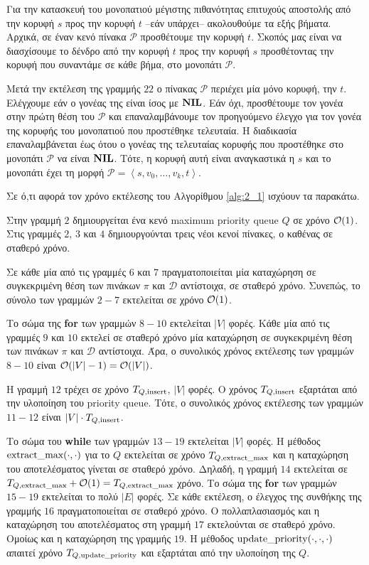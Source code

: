 

Για την κατασκευή του μονοπατιού μέγιστης πιθανότητας επιτυχούς αποστολής από την κορυφή $s$ προς την κορυφή $t$ --εάν υπάρχει-- ακολουθούμε τα εξής βήματα. Αρχικά, σε έναν κενό πίνακα $\mathcal{P}$ προσθέτουμε την κορυφή $t$. Σκοπός μας είναι να διασχίσουμε το δένδρο από την κορυφή $t$ προς την κορυφή $s$ προσθέτοντας την κορυφή που συναντάμε σε κάθε βήμα, στο μονοπάτι $\mathcal{P}$.\par
Μετά την εκτέλεση της γραμμής $22$ ο πίνακας $\mathcal{P}$ περιέχει μία μόνο κορυφή, την $t$. Ελέγχουμε εάν ο γονέας της είναι ίσος με ${\textbf{NIL}}$. Εάν όχι, προσθέτουμε τον γονέα στην πρώτη θέση του $\mathcal{P}$ και επαναλαμβάνουμε τον προηγούμενο έλεγχο για τον γονέα της κορυφής του μονοπατιού που προστέθηκε τελευταία. Η διαδικασία επαναλαμβάνεται έως ότου ο γονέας της τελευταίας κορυφής που προστέθηκε στο μονοπάτι $\mathcal{P}$ να είναι ${\textbf{NIL}}$. Τότε, η κορυφή αυτή είναι αναγκαστικά η $s$ και το μονοπάτι έχει τη μορφή $\mathcal{P}=\left\langle s,v_0,\ldots,v_k,t\right\rangle$.\par
\vspace*{6pt}\par
Σε ό,τι αφορά τον χρόνο εκτέλεσης του Αλγορίθμου \ref{alg:2_1} ισχύουν τα παρακάτω.\par
Στην γραμμή $2$ δημιουργείται ένα κενό maximum priority queue $Q$ σε χρόνο $\mathcal{O}(1)$. Στις γραμμές $2$, $3$ και $4$ δημιουργούνται τρεις νέοι κενοί πίνακες, ο καθένας σε σταθερό χρόνο.\par
Σε κάθε μία από τις γραμμές $6$ και $7$ πραγματοποιείται μία καταχώρηση σε συγκεκριμένη θέση των πινάκων $\pi$ και $\mathcal{D}$ αντίστοιχα, σε σταθερό χρόνο. Συνεπώς, το σύνολο των γραμμών $2-7$ εκτελείται σε χρόνο $\mathcal{O}(1)$.\par
Το σώμα της \textbf{for} των γραμμών $8-10$ εκτελείται $|V|$ φορές. Κάθε μία από τις γραμμές $9$ και $10$ εκτελεί σε σταθερό χρόνο μία καταχώρηση σε συγκεκριμένη θέση των πινάκων $\pi$ και $\mathcal{D}$ αντίστοιχα. Άρα, ο συνολικός χρόνος εκτέλεσης των γραμμών $8-10$ είναι $\mathcal{O}(|V|-1)=\mathcal{O}(|V|)$.\par
Η γραμμή $12$ τρέχει σε χρόνο $T_{Q,\text{{insert}}}$, $|V|$ φορές. Ο χρόνος $T_{Q,\text{{insert}}}$ εξαρτάται από την υλοποίηση του priority queue. Τότε, ο συνολικός χρόνος εκτέλεσης των γραμμών $11-12$ είναι $|V|\cdot T_{Q,\text{{insert}}}$.\par

Το σώμα του \textbf{while} των γραμμών $13-19$ εκτελείται $|V|$ φορές. Η μέθοδος $\text{{extract\_max}}(\cdot,\cdot)$ για το $Q$ εκτελείται σε χρόνο $T_{Q,\text{{extract\_max}}}$ και η καταχώρηση του αποτελέσματος γίνεται σε σταθερό χρόνο. Δηλαδή, η γραμμή $14$ εκτελείται σε $T_{Q,\text{{extract\_max}}}+\mathcal{O}(1) = T_{Q,\text{{extract\_max}}}$ χρόνο. Το σώμα της \textbf{for} των γραμμών $15-19$ εκτελείται το πολύ $|E|$ φορές. Σε κάθε εκτέλεση, ο έλεγχος της συνθήκης της γραμμής $16$ πραγματοποιείται σε σταθερό χρόνο. Ο πολλαπλασιασμός και η καταχώρηση του αποτελέσματος στη γραμμή $17$ εκτελούνται σε σταθερό χρόνο. Ομοίως και η καταχώρηση της γραμμής $19$. Η μέθοδος $\text{{update\_priority}}(\cdot,\cdot,\cdot)$ απαιτεί χρόνο $T_{Q,\text{{update\_priority}}}$ και εξαρτάται από την υλοποίηση της $Q$.\par

